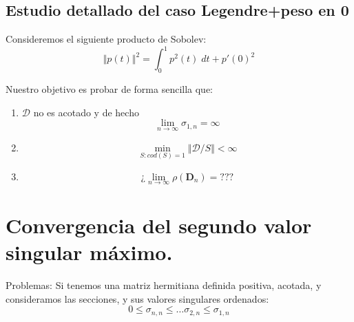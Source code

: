 \documentclass[11pt]{article}
\begin{document}
\subsection{Estudio detallado del caso Legendre+peso en 0}

\noindent Consideremos el siguiente producto de Sobolev:
$$
  \Vert p(t)\Vert^{2} = \int_{0}^{1} p^2(t)\; dt + p'(0)^{2}
$$


\noindent Nuestro objetivo es probar de forma sencilla que:
\begin{enumerate}
  \item $\mathcal{D}$ no es acotado y de hecho
        $$
          \lim_{n \to \infty} \sigma_{1,n}=\infty
        $$

  \item
        $$\min_{S: cod(S)=1} \Vert \mathcal{D}/S \Vert < \infty
        $$

  \item $$¿\lim_{n\to\infty} \rho(\mathbf{D}_n)= ???$$
\end{enumerate}


\section{Convergencia del  segundo valor singular máximo.}

\noindent Problemas:  Si tenemos una matriz hermitiana definida positiva, acotada, y consideramos las secciones, y sus valores singulares ordenados:
$$
  0 \leq \sigma_{n,n}\leq \dots \sigma_{2,n} \leq \sigma_{1,n}
$$
\end{document}
